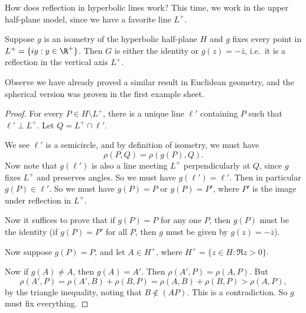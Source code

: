 \documentclass[a4paper]{article}
\begin{document}
How does reflection in hyperbolic lines work? This time, we work in the upper half-plane model, since we have a favorite line $L^+$.
\begin{lemma}
  Suppose $g$ is an isometry of the hyperbolic half-plane $H$ and $g$ fixes every point in $L^+ = \{iy: y \in \R^+\}$. Then $G$ is either the identity or $g(z) = -\bar{z}$, i.e.\ it is a reflection in the vertical axis $L^+$.
\end{lemma}
Observe we have already proved a similar result in Euclidean geometry, and the spherical version was proven in the first example sheet.
\begin{proof}
  For every $P \in H \setminus L^+$, there is a unique line $\ell'$ containing $P$ such that $\ell' \perp L^+$. Let $Q = L^+ \cap \ell'$.
  \begin{center}
  \end{center}
  We see $\ell'$ is a semicircle, and by definition of isometry, we must have
  \[
    \rho(P, Q) = \rho(g(P), Q).
  \]
  Now note that $g(\ell')$ is also a line meeting $L^+$ perpendicularly at $Q$, since $g$ fixes $L^+$ and preserves angles. So we must have $g(\ell') = \ell'$. Then in particular $g(P) \in \ell'$. So we must have $g(P) = P$ or $g(P) = P'$, where $P'$ is the image under reflection in $L^+$.

  Now it suffices to prove that if $g(P) = P$ for any one $P$, then $g(P)$ must be the identity (if $g(P) = P'$ for all $P$, then $g$ must be given by $g(z) = -\bar{z}$).

  Now suppose $g(P) = P$, and let $A \in H^+$, where $H^+ = \{z \in H: \Re z > 0\}$.
  \begin{center}
  \end{center}
  Now if $g(A) \not= A$, then $g(A) = A'$. Then $\rho(A', P) = \rho(A, P)$. But
  \[
    \rho(A', P) = \rho(A', B) + \rho(B, P) = \rho(A, B) + \rho(B, P) > \rho(A, P),
  \]
  by the triangle inequality, noting that $B \not\in (AP)$. This is a contradiction. So $g$ must fix everything.
\end{proof}
\end{document}
